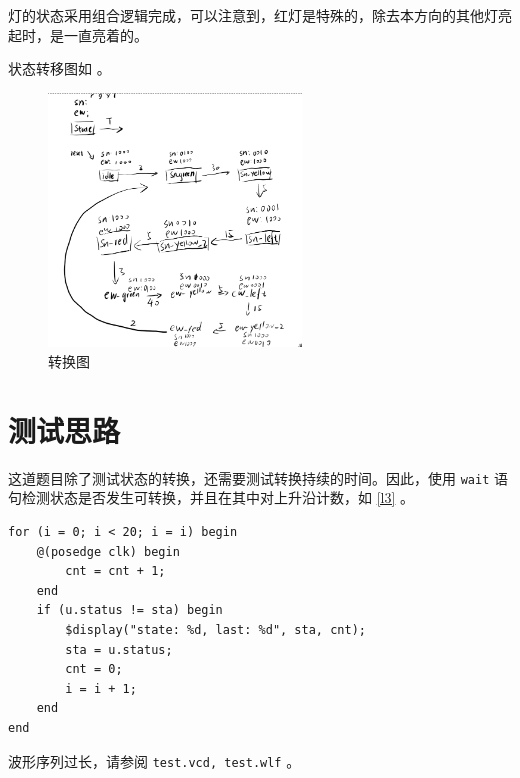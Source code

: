\documentclass[lang=cn]{elegantpaper}
\begin{document}
灯的状态采用组合逻辑完成，可以注意到，红灯是特殊的，除去本方向的其他灯亮起时，是一直亮着的。

状态转移图如  。


\begin{figure}[htb]
    \centering
    \caption{转换图}\label{01}
    \includegraphics[width=0.6\textwidth]{fsm.png}
\end{figure}


\section{测试思路}

这道题目除了测试状态的转换，还需要测试转换持续的时间。因此，使用 \lstinline{wait} 语句检测状态是否发生可转换，并且在其中对上升沿计数，如 \ref{l3} 。

\begin{lstlisting}[caption={状态计时},label={l3}]
for (i = 0; i < 20; i = i) begin
    @(posedge clk) begin
        cnt = cnt + 1; 
    end
    if (u.status != sta) begin
        $display("state: %d, last: %d", sta, cnt); 
        sta = u.status;
        cnt = 0;
        i = i + 1;
    end
end    
\end{lstlisting}

波形序列过长，请参阅 \lstinline{test.vcd, test.wlf} 。
\end{document}
